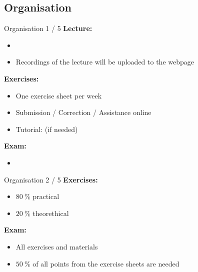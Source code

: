 \subsection{Organisation}

\begin{frame}{Organisation 1 / 5}
  \textbf{Lecture:}
  \begin{itemize}
    \item
      {\color{Mittel-Gruen}\LectureOrganisationLecture}
    \item
      Recordings of the lecture will be uploaded to the webpage
  \end{itemize}
  \textbf{Exercises:}
  \begin{itemize}
    \item
      One exercise sheet per week
    \item
      Submission / Correction / Assistance online
    \item
      Tutorial: (if needed)\\
      {\color{Mittel-Gruen}\LectureOrganisationHelp}
  \end{itemize}
  \textbf{Exam:}\\
  \begin{itemize}
    \item
      {\color{Mittel-Gruen}\LectureOrganisationExam}
  \end{itemize}
\end{frame}


\begin{frame}{Organisation 2 / 5}
  \textbf{Exercises:}
  \begin{itemize}
    \item
      {\color{Mittel-Blau}$\SI{80}{\percent}$} practical
    \item
      {\color{Mittel-Blau}$\SI{20}{\percent}$} theorethical
  \end{itemize}
  \textbf{Exam:}
  \begin{itemize}
    \item
      All exercises and materials
    \item
      {\color{Mittel-Blau}$\SI{50}{\percent}$} of all points from
      the exercise sheets are needed
  \end{itemize}
\end{frame}


